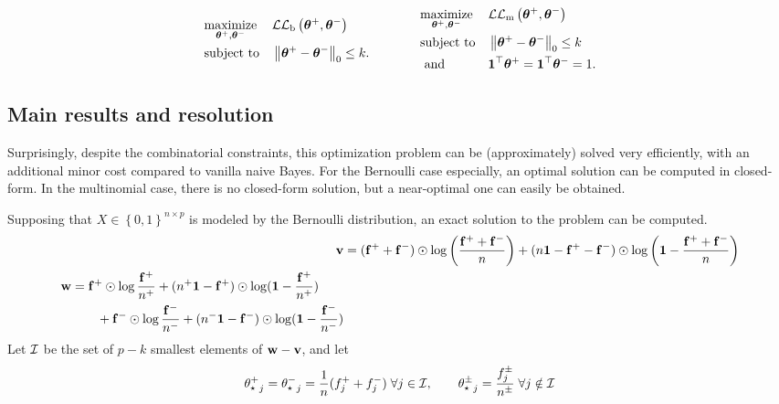 \begin{equation*}
        \begin{aligned}
                & \underset{\bm{\theta}^+, \bm{\theta}^-}{\text{maximize}}
                & & \mathcal{L}\mathcal{L}_\text{b}\left( \bm{\theta}^+, \bm{\theta}^- \right)\\
                & \text{subject to}
                & & \left\lVert\bm{\theta}^+ - \bm{\theta}^-\right\rVert_0 \leq k.
        \end{aligned}
        \qquad\qquad
        \begin{aligned}
                & \underset{\bm{\theta}^+, \bm{\theta}^-}{\text{maximize}}
                & & \mathcal{L}\mathcal{L}_\text{m}\left( \bm{\theta}^+, \bm{\theta}^- \right)\\
                & \text{subject to}
                & & \left\lVert\bm{\theta}^+ - \bm{\theta}^-\right\rVert_0 \leq k\\
                & \text{ and }
                & & \mathbf{1}^\top\bm{\theta}^+ = \mathbf{1}^\top\bm{\theta}^- = 1.
        \end{aligned}
\end{equation*}

\subsection{Main results and resolution}\label{subsec:snb_th}

Surprisingly, despite the combinatorial constraints,
this optimization problem can be (approximately) solved very efficiently,
with an additional minor cost compared to vanilla naive Bayes.
For the Bernoulli case especially, an optimal solution can be computed in closed-form.
In the multinomial case, there is no closed-form solution, but a near-optimal one can easily be obtained.
\begin{theorem}
        Supposing that $X \in \left\{ 0, 1 \right\}^{n \times p}$ is modeled by the Bernoulli distribution,
        an exact solution to the problem can be computed.
        \begin{align*}
                \mathbf{v} &= (\mathbf{f}^+ + \mathbf{f}^-) \odot \log\left( \frac{\mathbf{f}^+ + \mathbf{f}^-}{n} \right)
                        + (n\mathbf{1} - \mathbf{f}^+ - \mathbf{f}^-) \odot \log\left( \mathbf{1} - \frac{\mathbf{f}^+ + \mathbf{f}^-}{n} \right)\\
                \begin{split}
                        \mathbf{w} &= \mathbf{f}^+ \odot \log \frac{\mathbf{f}^+}{n^+} + (n^+\mathbf{1} - \mathbf{f}^+) \odot \log (\mathbf{1} - \frac{\mathbf{f}^+}{n^+})\\
                        &\qquad + \mathbf{f}^- \odot \log \frac{\mathbf{f}^-}{n^-} + (n^-\mathbf{1} - \mathbf{f}^-) \odot \log (\mathbf{1} - \frac{\mathbf{f}^-}{n^-})
                \end{split}
        \end{align*}
        Let $\mathcal{I}$ be the set of $p - k$ smallest elements of $\mathbf{w} - \mathbf{v}$, and let
        \begin{equation*}
                {\theta^+_\star}_j = {\theta^-_\star}_j = \frac{1}{n}(f_j^+ + f_j^-)
                \;\forall j \in \mathcal{I}
                ,\qquad
                {\theta^\pm_\star}_j = \frac{f^\pm_j}{n^\pm}
                \;\forall j \notin \mathcal{I}
        \end{equation*}
\end{theorem}

